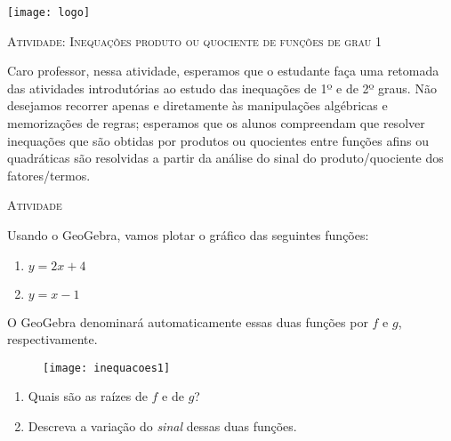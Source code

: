 \documentclass[10 pt,usenames,dvipsnames, oneside]{article}
\begin{document}
\begin{center}
  \begin{minipage}[l]{3cm}
\texttt{[image: logo]}    
\end{minipage}\hfill
\begin{minipage}[r]{.8\textwidth}
 {\Large \scshape Atividade: Inequações produto ou quociente de funções de grau 1}  
\end{minipage}
\end{center}
\vspace{.2cm}

\ifdefined\prof

\begin{sugestions}

Caro professor, nessa atividade, esperamos que o estudante faça uma retomada das atividades introdutórias ao estudo das inequações de 1º e de 2º graus. Não desejamos recorrer apenas e diretamente às manipulações algébricas e memorizações de regras; esperamos que os alunos compreendam que resolver inequações que são obtidas por produtos ou quocientes entre funções afins ou quadráticas são resolvidas a partir da análise do sinal do produto/quociente dos fatores/termos. 
\end{sugestions}

\bigskip
\begin{center}
{\large \scshape Atividade}
\end{center}
\fi

Usando o GeoGebra, vamos plotar o gráfico das seguintes funções:
\begin{enumerate}[label=\titem{\roman*)}]
\item $y=2x+4$
\item $y=x-1$
\end{enumerate}

O GeoGebra denominará automaticamente essas duas funções por $f$ e $g$, respectivamente.

\begin{figure}[H]
\centering

\texttt{[image: inequacoes1]}
\end{figure}


\begin{enumerate}
\item Quais são as raízes de $f$ e de $g$?
\item Descreva a variação do \textit{sinal} dessas duas funções. 
\end{enumerate}
\end{document}
